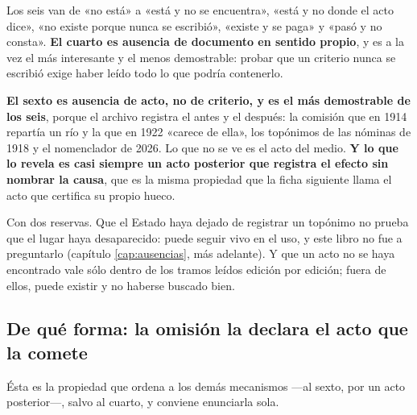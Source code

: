 Los seis van de «no está» a «está y no se encuentra», «está y no donde el acto dice», «no
existe porque nunca se escribió», «existe y se paga» y «pasó y no consta». \textbf{El cuarto es
ausencia de documento en sentido propio}, y es a la vez el más interesante y el menos demostrable: probar
que un criterio nunca se escribió exige haber leído todo lo que podría contenerlo.

\textbf{El sexto es ausencia de acto, no de criterio, y es el más demostrable de los seis},
porque el archivo registra el antes y el después: la comisión que en 1914 repartía un río y la
que en 1922 «carece de ella», los topónimos de las nóminas de 1918 y el nomenclador de 2026. Lo
que no se ve es el acto del medio. \textbf{Y lo que lo revela es casi siempre un acto posterior
que registra el efecto sin nombrar la causa}, que es la misma propiedad que la ficha siguiente
llama el acto que certifica su propio hueco.

\begin{cautela}
Con dos reservas. Que el Estado haya dejado de registrar un topónimo no prueba que el lugar haya
desaparecido: puede seguir vivo en el uso, y este libro no fue a preguntarlo (capítulo
\ref{cap:ausencias}, más adelante). Y que un acto no se haya encontrado vale sólo dentro de los tramos leídos
edición por edición; fuera de ellos, puede existir y no haberse buscado bien.
\end{cautela}

\subsection*{De qué forma: la omisión la declara el acto que la comete}

Ésta es la propiedad que ordena a los demás mecanismos ---al sexto, por un acto posterior---, salvo al cuarto, y conviene enunciarla sola.

